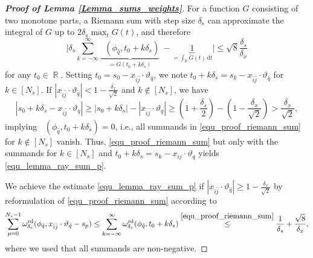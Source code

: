 \documentclass[11pt,reqno]{amsart}
\DeclareMathOperator{\RR}{\mathbb{R}}
\newcommand{\sums}{\sum_{p=0}^{N_s-1}}
\DeclareMathOperator{\RayWeight}{\omega^\mathrm{rd}_{\delta_\mathit{x}}}
\newcommand{\dd}[1]{\,\mathrm{d}{#1}}
\numberwithin{theorem}{section}
\theoremstyle{remark}
\begin{document}
\begin{proof}[\textbf{Proof of Lemma \ref{Lemma_sums_weights}}]
 For a function $G$ consisting of two monotone parts, a Riemann sum with step size $\delta_s$  can approximate the integral of $G$  up to $2 \delta_s \max_t G(t) $,  and therefore
\begin{equation} \label{equ_proof_riemann_sum}
    \Big|\delta_s \sum_{k=-\infty}^\infty \underbrace{\RayWeight(\phi_{\hat q},t_0+k \delta_s)}_{=G(t_0+k\delta_s)}\ - \underbrace{1}_{= \int_{\RR}  G(t) \dd t } \Big|\leq  \sqrt{8}\frac{\delta_s}{\delta_x} 
\end{equation}
for any $t_0\in \RR$. 
Setting $t_0 =s_0-x_{\hat i \hat j}\cdot \vartheta_{\hat q}$, we note $t_0+k \delta_s =s_{k}-x_{\hat i \hat j}\cdot \vartheta_{\hat q} $ for $k \in [N_s]$. If $|x_{\hat i \hat j}\cdot\vartheta_{\hat q}|<1-\frac{\delta_x}{\sqrt{2}}$ and $k\not \in [N_s]$, we have 
\begin{equation}
|s_0+k\delta_s-x_{\hat i \hat j}\cdot \vartheta_q| \geq |s_0+k \delta_s|-|x_{\hat i \hat j}\cdot \vartheta_q| \geq \left(1+\frac{\delta_s}{2}\right)-\left(1-\frac{\delta_x}{\sqrt{2}}\right)> \frac{\delta_x }{\sqrt{2}},
\end{equation} implying $\RayWeight(\phi_{\hat q},t_0+k\delta_s)=0$, i.e., all summands in \eqref{equ_proof_riemann_sum} for $k\not \in [N_s]$ vanish. Thus, \eqref{equ_proof_riemann_sum} but only with the summands for $k\in [N_s]$ and $t_0+k \delta_s =s_{k}-x_{ij}\cdot \vartheta_q $ yields \eqref{equ_lemma_ray_sum_p}. 

 
We achieve the estimate \eqref{equ_lemma_ray_sum_p} if $|x_{\hat i \hat j}\cdot\vartheta_{\hat q}|\geq 1-\frac{\delta_x}{\sqrt{2}}$ by reformulation of \eqref{equ_proof_riemann_sum} according to 
\begin{equation}
\sums \RayWeight(\phi_{\hat q}, x_{\hat i \hat j}\cdot \vartheta_{\hat q} - s_p) \leq \sum_{k=-\infty}^\infty \RayWeight(\phi_{\hat q},t_0+k \delta_s) \overset{\eqref{equ_proof_riemann_sum}}{\leq} \frac{1}{\delta_s}+  \frac{\sqrt{8}}{\delta_x},
\end{equation}
where we used that all summands are non-negative.


\end{proof}
\end{document}
